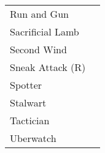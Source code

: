 \begin{table}[]
\begin{tabular}{ll}
    Run and Gun        &                                                                                                                                                                                                                                                                                   \\
    Sacrificial Lamb   &                                                                                                                                                                                                                                                                                   \\
    Second Wind        &                                                                                                                                                                                                                                                                                   \\
    Sneak Attack (R)   &                                                                                                                                                                                                                                                                                   \\
    Spotter            &                                                                                                                                                                                                                                                                                   \\
    Stalwart           &                                                                                                                                                                                                                                                                                   \\
    Tactician          &                                                                                                                                                                                                                                                                                   \\
    Uberwatch          &                                                                                                                                                                                                                                                                                   \\

\end{tabular}
\end{table}
